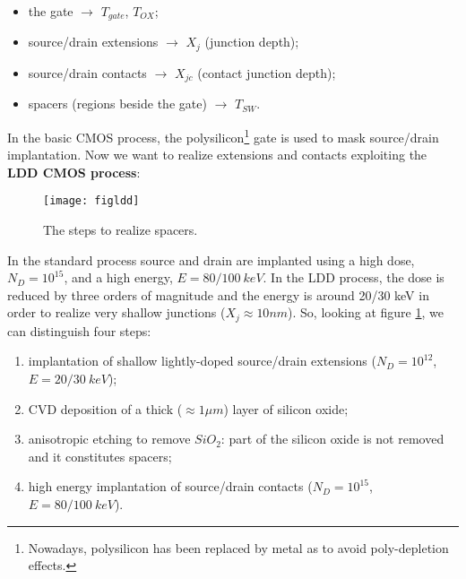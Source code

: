 \documentclass[a4paper, 12pt, twoside, openright]{report}
\begin{document}
{\begin{itemize}
\item the gate $\rightarrow$ $T_{gate}$, $T_{OX}$;
\item source/drain extensions $\rightarrow $ $X_{j}$ (junction depth);
\item source/drain contacts $\rightarrow$ $X_{jc}$ (contact junction depth);
\item spacers (regions beside the gate) $\rightarrow$ $T_{SW}$.
\end{itemize}

In the basic CMOS process, the polysilicon\footnote{Nowadays, polysilicon has been replaced by metal as to avoid poly-depletion effects.} gate is used to mask source/drain implantation. Now we want to realize extensions and contacts exploiting the \textbf{LDD CMOS process}:

	\begin{figure}[H]
	\centering
	\texttt{[image: figldd]}
	\caption{The steps to realize spacers.}
	\label{LDD_process}
	\end{figure}

In the standard process source and drain are implanted using a high dose, $N_D = 10^{15}$, and a high energy, $E = 80/100\ keV$. In the LDD process, the dose is reduced by three orders of magnitude and the energy is around 20/30 keV in order to realize very shallow junctions ($X_j \approx 10 nm$). So, looking at figure \ref{LDD_process}, we can distinguish four steps:

\begin{enumerate}
\item implantation of shallow lightly-doped source/drain extensions ($N_D = 10^{12}$, $E = 20/30\ keV$);
\item CVD deposition of a thick ($\approx 1\mu m$) layer of silicon oxide;
\item anisotropic etching to remove $SiO_{2}$: part of the silicon oxide is not removed and it constitutes spacers;
\item high energy implantation of source/drain contacts ($N_D = 10^{15}$, $E = 80/100\ keV$).
\end{enumerate}


}
\end{document}
